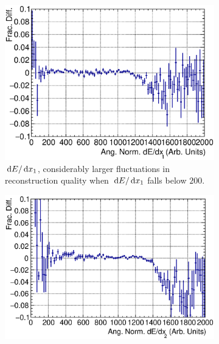   \begin{figure}[!htb]
      \centering
      \begin{subfigure}[!htb]{\dbfigwid\textwidth}
           \includegraphics[width=\textwidth]{figures/sel/fig53a.eps}
           \caption{$\,\textrm{d}E/\,\textrm{d}x_1$, considerably larger fluctuations in reconstruction quality when $\,\textrm{d}E/\,\textrm{d}x_1$ falls below $200$.}
           \label{subfig:ans-dedx0-ppr-slice}
      \end{subfigure}
      \begin{subfigure}[!htb]{\dbfigwid\textwidth}
           \includegraphics[width=\textwidth]{figures/sel/fig53b.eps}

\end{subfigure}
\end{figure}
